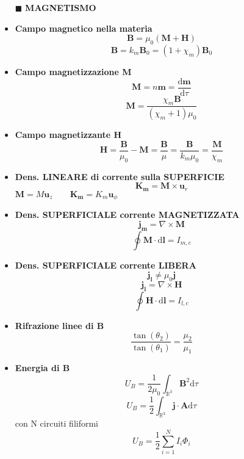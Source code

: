 \documentclass{book}
\newcommand{\g}{\textbf}
\newcommand{\h}{\mathbf}
\newcommand{\e}{\begin{equation}}
\newcommand{\ex}{\end{equation} }
\renewcommand{\it}{\item[$\cdot$]}
\begin{document}
\begin{multicols}{4}
\begin{itemize}
\item [$\blacksquare$] \g{MAGNETISMO}
    \it \g{Campo magnetico nella materia}
        \e{\h{B}=\mu_0(\h{M}+\h{H})} \ex
        \e{\h{B}=k_m\h{B}_0=(1+\chi_m)\h{B}_0} \ex
    \it \g{Campo magnetizzazione M}
        \e{\h{M}=n\h{m}=\frac{\mathrm{d}\h{m}}{\mathrm{d}\tau}} \ex
        \e{\h{M}=\frac{\chi_m \h{B}}{(\chi_m+1)\mu_0}} \ex
    \it \g{Campo magnetizzante H}
        \e{\h{H}=\frac{\h{B}}{\mu_0}-\h{M}=\frac{\h{B}}{\mu}=\frac{\h{B}}{k_m\mu_0}=\frac{\h{M}}{\chi_m}} \ex
    \it \g{Dens. LINEARE di corrente sulla SUPERFICIE}
        \e{\h{K_m}=\h{M}\times\h{u}_r} \ex
        $\h{M}=M\h{u}_z \qquad \h{K_m}=K_m\h{u}_\phi$ \\
    \it \g{Dens. SUPERFICIALE corrente MAGNETIZZATA}
        \e{\h{j_m}=\nabla\times\h{M}} \ex
        \e{\oint\h{M}\cdot\mathrm{d}\h{{l}}=I_{m,c}} \ex
    \it \g{Dens. SUPERFICIALE corrente LIBERA}
        \e{\h{j_l}\neq\mu_0\h{j}} \ex
        \e{\h{j_l}=\nabla\times\h{H}} \ex
        \e{\oint\h{H}\cdot\mathrm{d}\h{l}=I_{l,c}} \ex
    \it \g{Rifrazione linee di B}
        \e{\frac{\tan(\theta_2)}{\tan(\theta_1)}=\frac{\mu_2}{\mu_1}} \ex
    \it \g{Energia di B}
        \e{ U_B=\frac{1}{2 \mu_{0}} \int_{\mathbb{R}^3} \h{B}^{2} \mathrm{d}\tau }\ex
        \e{U_B=\frac{1}{2}\int_{\mathbb{R}^3}\h{j}\cdot\h{A}\mathrm{d}\tau} \ex
        con N circuiti filiformi
        \e{U_B=\frac{1}{2}\sum_{i=1}^N I_i\Phi_i} \ex


\end{itemize}
\end{multicols}
\end{document}
